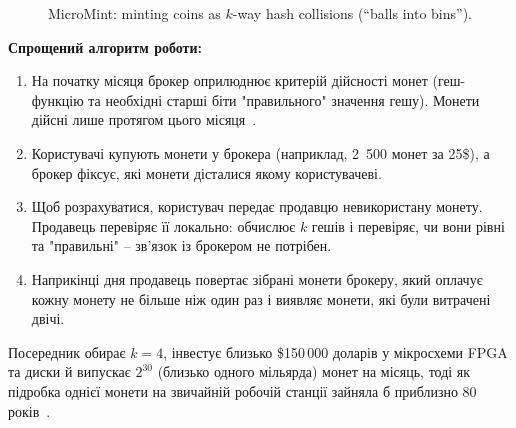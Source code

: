 \begin{figure}[H]
    \centering
    \caption{MicroMint: minting coins as $k$-way hash collisions (\enquote{balls into bins}).}
    \label{fig:micromint}
\end{figure}

\textbf{Спрощений алгоритм роботи:}
\begin{enumerate}[noitemsep]
    \item На початку місяця брокер оприлюднює критерій дійсності монет (геш-функцію та необхідні старші біти 
        "правильного"{} значення гешу). Монети дійсні лише протягом цього місяця~\cite{rivest1996micromint}.
    \item Користувачі купують монети у брокера (наприклад, 2~500 монет за 25\$), а брокер фіксує, які монети 
        дісталися якому користувачеві.
    \item Щоб розрахуватися, користувач передає продавцю невикористану монету. Продавець перевіряє її локально: 
        обчислює $k$ гешів і перевіряє, чи вони рівні та "правильні"{} -- зв'язок із брокером не потрібен.
    \item Наприкінці дня продавець повертає зібрані монети брокеру, який оплачує кожну монету не більше ніж один 
        раз і виявляє монети, які були витрачені двічі.
\end{enumerate}
Посередник обирає $k = 4$, інвестує близько \$150\,000 доларів у мікросхеми FPGA та диски й випускає $2^{30}$ 
(близько одного мільярда) монет на місяць, тоді як підробка однієї монети на звичайній робочій станції зайняла 
б приблизно 80 років~\cite{rivest1996micromint}.

